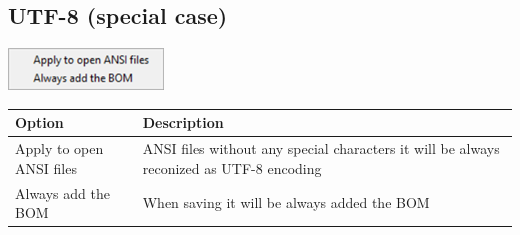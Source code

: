 \hypertarget{menu_format_utf8}{}
\subsection{UTF-8 (special case)}

\includegraphics[scale=0.50]{./res/menu_format_utf8.png}\\

\begin{scriptsize}
  \begin{tabularx}{\textwidth}{>{\hsize=0.4\hsize}X>{\hsize=0.6\hsize}X}\\
    \hline
    \textbf{Option} & \textbf{Description} \\
    \hline
    Apply to open ANSI files & ANSI files without any special characters it will be always
      reconized as UTF-8 encoding \\
    Always add the BOM & When saving it will be always added the BOM \\
    \hline
  \end{tabularx}
\end{scriptsize}
